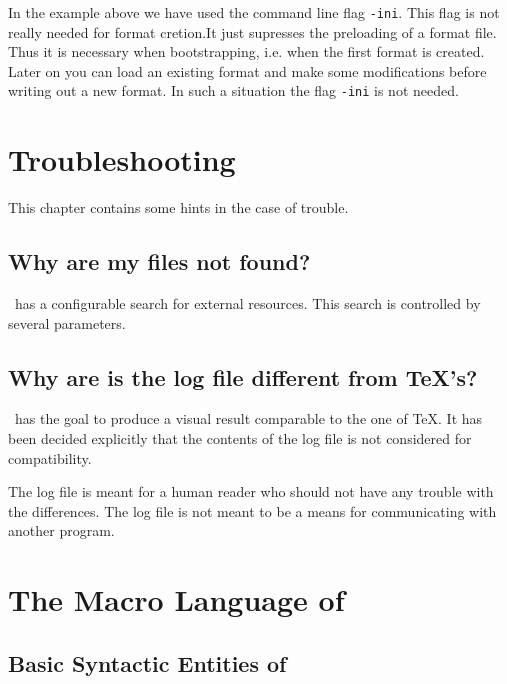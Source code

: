 \documentclass{extex-doc}
\makeatletter
\newcommand\CLI[1]{\texttt{-#1}\index{#1@\texttt{-#1}}}
\makeatother
\begin{document}
In the example above we have used the command line flag \CLI{ini}.
This flag is not really needed for format cretion.It just supresses
the preloading of a format file. Thus it is necessary when
bootstrapping, i.e. when the first format is created. Later on you can
load an existing format and make some modifications before writing out
a new format. In such a situation the flag \CLI{ini} is not needed.




\chapter{Troubleshooting \ExTeX}

This chapter contains some hints in the case of trouble.

\section{Why are my files not found?}

\ExTeX\ has a configurable search for external resources. This search
is controlled by several parameters.

\INCOMPLETE

\section{Why are is the log file different from \TeX's?}

\ExTeX\ has the goal to produce a visual result comparable to the one
of \TeX. It has been decided explicitly that the
contents of the log file is not considered for
compatibility.

The log file is meant for a human reader who should not have any
trouble with the differences. The log file is not meant to be a means
for communicating with another program.


\chapter{The Macro Language of \ExTeX}

\section{Basic Syntactic Entities of \ExTeX}
\end{document}
